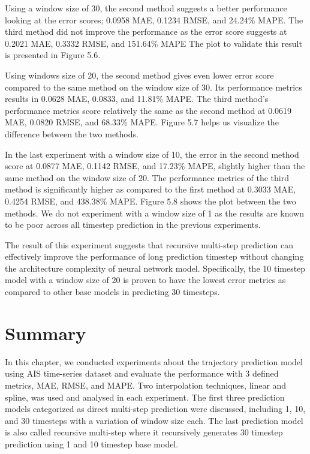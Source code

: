 Using a window size of 30, the second method suggests a better performance looking at the error scores; 0.0958 MAE, 0.1234 RMSE, and 24.24\% MAPE. The third method did not improve the performance as the error score suggests at 0.2021 MAE, 0.3332 RMSE, and 151.64\% MAPE The plot to validate this result is presented in Figure 5.6.

Using windows size of 20, the second method gives even lower error score compared to the same method on the window size of 30. Its performance metrics results in 0.0628 MAE, 0.0833, and 11.81\% MAPE. The third method's performance metrics score relatively the same as the second method at 0.0619 MAE, 0.0820 RMSE, and 68.33\% MAPE. Figure 5.7 helps us visualize the difference between the two methods.

In the last experiment with a window size of 10, the error in the second method score at 0.0877 MAE, 0.1142 RMSE, and 17.23\% MAPE, slightly higher than the same method on the window size of 20. The performance metrics of the third method is significantly higher as compared to the first method at 0.3033 MAE, 0.4254 RMSE, and 438.38\% MAPE. Figure 5.8 shows the plot between the two methods. We do not experiment with a window size of 1 as the results are known to be poor across all timestep prediction in the previous experiments. 

The result of this experiment suggests that recursive multi-step prediction can effectively improve the performance of long prediction timestep without changing the architecture complexity of neural network model. Specifically, the 10 timestep model with a window size of 20 is proven to have the lowest error metrics as compared to other base models in predicting 30 timesteps.

\section{Summary}
In this chapter, we conducted experiments about the trajectory prediction model using AIS time-series dataset and evaluate the performance with 3 defined metrics, MAE, RMSE, and MAPE. Two interpolation techniques, linear and spline, was used and analysed in each experiment. The first three prediction models categorized as direct multi-step prediction were discussed, including 1, 10, and 30 timesteps with a variation of window size each. The last prediction model is also called recursive multi-step where it recursively generates 30 timestep prediction using 1 and 10 timestep base model. 